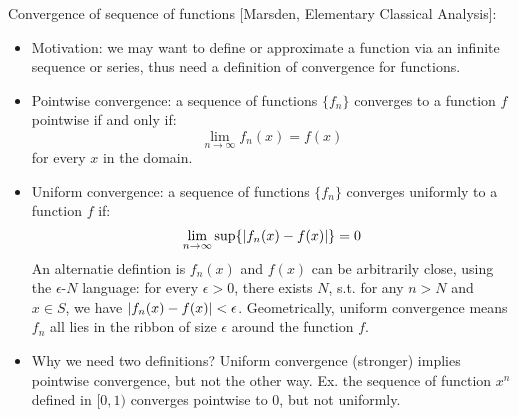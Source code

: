 \documentclass{report}
\begin{document}
Convergence of sequence of functions [Marsden, Elementary Classical Analysis]: 
\begin{itemize}
\item Motivation: we may want to define or approximate a function via an infinite sequence or series, thus need a definition of convergence for functions. 

\item Pointwise convergence: a sequence of functions $\{f_n\}$ converges to a function $f$ pointwise if and only if: 
\begin{equation}
\lim_{n \to \infty} f_n(x) = f(x)	
\end{equation}
for every $x$ in the domain. 

\item Uniform convergence: a sequence of functions $\{f_n\}$ converges uniformly to a function $f$ if: 
\begin{equation}
\lim_{n \to \infty} \sup \{ \lvert f_n(x) - f(x)\rvert\} = 0	
\end{equation}
An alternatie defintion is $f_n(x)$ and $f(x)$ can be arbitrarily close, using the $\epsilon$-$N$ language: for every $\epsilon > 0$, there exists $N$, s.t. for any $n > N$ and $x \in S$, we have $\lvert f_n(x) - f(x)\rvert < \epsilon$. Geometrically, uniform convergence means $f_n$ all lies in the ribbon of size $\epsilon$ around the function $f$. 

\item Why we need two definitions? Uniform convergence (stronger) implies pointwise convergence, but not the other way. Ex. the sequence of function $x^n$ defined in $[0,1)$ converges pointwise to $0$, but not uniformly. 
\end{itemize}
\end{document}
